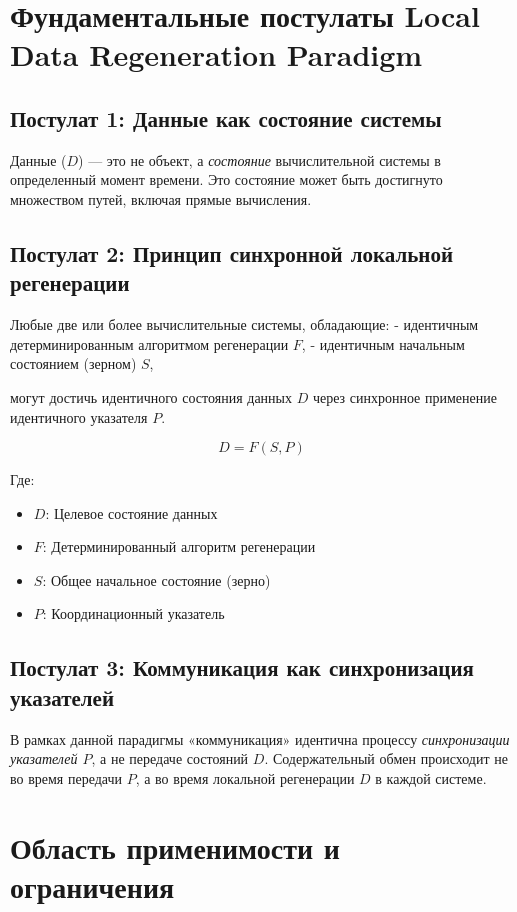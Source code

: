 \documentclass[11pt,a4paper]{article}
\begin{document}
\section{Фундаментальные постулаты Local Data Regeneration Paradigm}

\subsection{Постулат 1: Данные как состояние системы}

Данные ($D$) — это не объект, а \emph{состояние} вычислительной системы в определенный момент времени. Это состояние может быть достигнуто множеством путей, включая прямые вычисления.

\subsection{Постулат 2: Принцип синхронной локальной регенерации}

Любые две или более вычислительные системы, обладающие:
- идентичным детерминированным алгоритмом регенерации $F$,
- идентичным начальным состоянием (зерном) $S$,

могут достичь идентичного состояния данных $D$ через синхронное применение идентичного указателя $P$.

\begin{equation}
D = F(S, P)
\end{equation}

Где:
\begin{itemize}
    \item $D$: Целевое состояние данных
    \item $F$: Детерминированный алгоритм регенерации
    \item $S$: Общее начальное состояние (зерно)
    \item $P$: Координационный указатель
\end{itemize}

\subsection{Постулат 3: Коммуникация как синхронизация указателей}

В рамках данной парадигмы «коммуникация» идентична процессу \emph{синхронизации указателей $P$}, а не передаче состояний $D$. Содержательный обмен происходит не во время передачи $P$, а во время локальной регенерации $D$ в каждой системе.

\section{Область применимости и ограничения}
\end{document}
